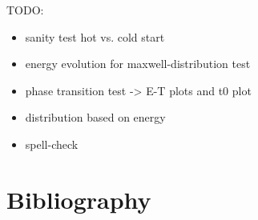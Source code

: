 \newpage
TODO:
\begin{itemize}
\item sanity test hot vs. cold start
\item energy evolution for maxwell-distribution test
\item phase transition test -> E-T plots and t0 plot
\item distribution based on energy
\item spell-check
\end{itemize}


\newpage
\section*{Bibliography}
\printbibliography[heading=none, keyword={secondary}]


